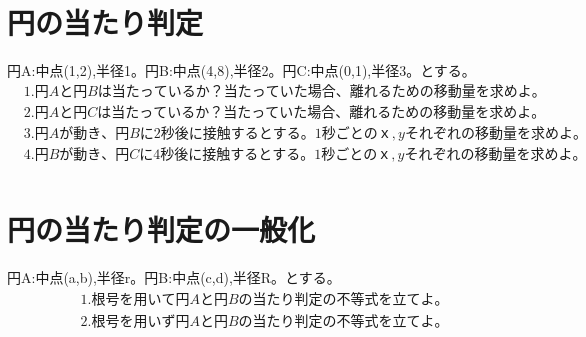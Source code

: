 \documentclass[paper=b4j,landscape,twocolumn,fleqn]{jlreq}
\begin{document}
\section{円の当たり判定}
円A:中点(1,2),半径1。円B:中点(4,8),半径2。円C:中点(0,1),半径3。とする。
\begin{align*}
　&1.　円Aと円Bは当たっているか？　当たっていた場合、離れるための移動量を求めよ。\\[1em]
　&2.　円Aと円Cは当たっているか？　当たっていた場合、離れるための移動量を求めよ。\\[1em]
　&3.　円Aが動き、円Bに2秒後に接触するとする。1秒ごとのｘ,yそれぞれの移動量を求めよ。\\[1em]
　&4.　円Bが動き、円Cに4秒後に接触するとする。1秒ごとのｘ,yそれぞれの移動量を求めよ。\\[1em]
\end{align*}
\section{円の当たり判定の一般化}
円A:中点(a,b),半径r。円B:中点(c,d),半径R。とする。
\begin{align*}
　&1.　根号を用いて円Aと円Bの当たり判定の不等式を立てよ。\\[1em]
　&2.　根号を用いず円Aと円Bの当たり判定の不等式を立てよ。\\[1em]
\end{align*}
\end{document}
